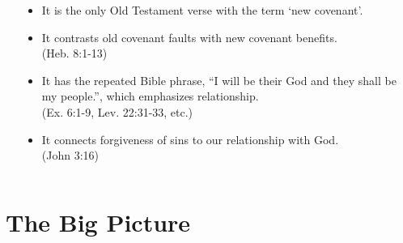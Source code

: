\begin{frame}
\begin{columns}
\begin{column}{0.4\textwidth}
\end{column}
\begin{column}{0.6\textwidth}
\begin{itemize}
\item It is the only Old Testament verse with the term `new covenant'.
\item It contrasts old covenant faults with new covenant benefits.\\{\footnotesize (Heb. 8:1-13)}
\item It has the repeated Bible phrase, ``I will be their God and they shall be my people.'', which emphasizes relationship.\\{\footnotesize (Ex. 6:1-9, Lev. 22:31-33, etc.)}
\item It connects forgiveness of sins to our relationship with God.\\ {\footnotesize(John 3:16)}
\end{itemize}
\end{column}
\end{columns}
\end{frame}


\section{The Big Picture}

